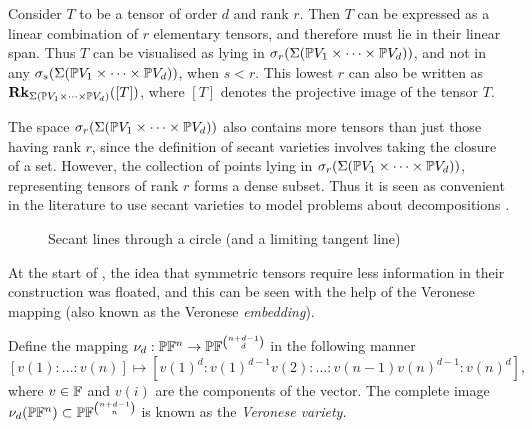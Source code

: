 \documentclass[../Lael_John_MasterThesis_Draft.tex]{subfiles}
\begin{document}
Consider $T$ to be a tensor of order $d$ and rank $r$. Then $T$ can be expressed as a linear combination of $r$ elementary tensors, and therefore must lie in their linear span. Thus $T$ can be visualised as lying in $\sigma_r(\Sigma(\mathbb{P} V_1 \times \cdots \times \mathbb{P} V_d))$, and not in any $\sigma_s(\Sigma(\mathbb{P} V_1 \times \cdots \times \mathbb{P} V_d))$, when $s < r$. This lowest $r$ can also be written as $\textbf{Rk}_{\Sigma(\mathbb{P} V_1 \times \cdots \times \mathbb{P} V_d)}([T])$, where $[T]$ denotes the projective image of the tensor $T$.
\begin{remark}
    The space $\sigma_r(\Sigma(\mathbb{P} V_1 \times \cdots \times \mathbb{P} V_d))$ also contains more tensors than just those having rank $r$, since the definition of secant varieties involves taking the closure of a set. However, the collection of points lying in $\sigma_r(\Sigma(\mathbb{P} V_1 \times \cdots \times \mathbb{P} V_d))$, representing tensors of rank $r$ forms a dense subset. Thus it is seen as convenient in the literature to use secant varieties to model problems about decompositions \cites{ballico_tensor_2013, bernardi_hitchhiker_2018}.
\end{remark}
\begin{figure}
    \centering
    \caption{Secant lines through a circle (and a limiting tangent line)}\label{figure:secantexample}
\end{figure}
At the start of , the idea that symmetric tensors require less information in their construction was floated, and this can be seen with the help of the Veronese mapping (also known as the Veronese \textit{embedding}).
\begin{definition}\label{defn:veronesemapping}
    Define the mapping $\nu_d:\mathbb{P} \mathbb{F}^n \to \mathbb{P} \mathbb{F}^{\binom{n + d - 1}{d}}$ in the following manner $$[v(1): \ldots : v(n)] \mapsto [v(1)^d: v(1)^{d-1}v(2): \ldots : v(n-1)v(n)^{d-1}:v(n)^d], $$where $v \in \mathbb{F}$ and $v(i)$ are the components of the vector. The complete image $\nu_d(\mathbb{P}\mathbb{F}^n) \subset \mathbb{P}\mathbb{F}^{\binom{n+d-1}{n}}$ is known as the \textit{Veronese variety.}
\end{definition}
\end{document}
